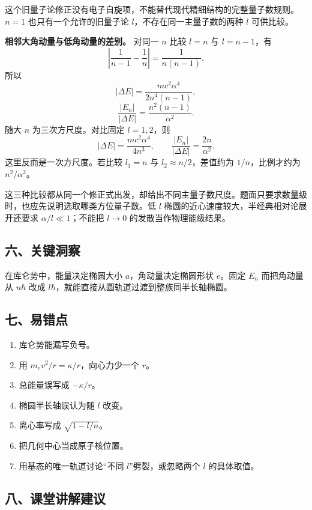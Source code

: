 \documentclass[12pt,a4paper,UTF8]{ctexart}
\newcommand{\tightlist}{\setlength{\itemsep}{0pt}\setlength{\parskip}{0pt}}
\begin{document}
这个旧量子论修正没有电子自旋项，不能替代现代精细结构的完整量子数规则。\(n=1\)
也只有一个允许的旧量子论 \(l\)，不存在同一主量子数的两种 \(l\)
可供比较。

\textbf{相邻大角动量与低角动量的差别。} 对同一 \(n\) 比较 \(l=n\) 与
\(l=n-1\)，有 \[
\left|\frac1{n-1}-\frac1n\right|=\frac1{n(n-1)}.
\] 所以 \[
|\Delta E|=\frac{mc^2\alpha^4}{2n^4(n-1)},
\] \[
\frac{|E_n|}{|\Delta E|}=\frac{n^2(n-1)}{\alpha^2}.
\] 随大 \(n\) 为三次方尺度。对比固定 \(l=1,2\)，则 \[
|\Delta E|=\frac{mc^2\alpha^4}{4n^3},\qquad
\frac{|E_n|}{|\Delta E|}=\frac{2n}{\alpha^2}.
\] 这里反而是一次方尺度。若比较 \(l_1=n\) 与
\(l_2\approx n/2\)，差值约为 \(1/n\)，比例才约为 \(n^2/\alpha^2\)。

这三种比较都从同一个修正式出发，却给出不同主量子数尺度。题面只要求数量级时，也应先说明选取哪类方位量子数。低
\(l\) 椭圆的近心速度较大，半经典相对论展开还要求
\(\alpha/l\ll1\)；不能把 \(l\to0\) 的发散当作物理能级结果。

\subsection{六、关键洞察}\label{ux516dux5173ux952eux6d1eux5bdf-7}

在库仑势中，能量决定椭圆大小 \(a\)，角动量决定椭圆形状 \(e\)。固定
\(E_n\) 而把角动量从 \(n\hbar\) 改成
\(l\hbar\)，就能直接从圆轨道过渡到整族同半长轴椭圆。

\subsection{七、易错点}\label{ux4e03ux6613ux9519ux70b9-7}

\begin{enumerate}
\def\labelenumi{\arabic{enumi}.}
\tightlist
\item
  库仑势能漏写负号。
\item
  用 \(m_ev^2/r=\kappa/r\)，向心力少一个 \(r\)。
\item
  总能量误写成 \(-\kappa/r\)。
\item
  椭圆半长轴误认为随 \(l\) 改变。
\item
  离心率写成 \(\sqrt{1-l/n}\)。
\item
  把几何中心当成原子核位置。
\item
  用基态的唯一轨道讨论``不同 \(l\)''劈裂，或忽略两个 \(l\) 的具体取值。
\end{enumerate}

\subsection{八、课堂讲解建议}\label{ux516bux8bfeux5802ux8bb2ux89e3ux5efaux8bae-7}
\end{document}
